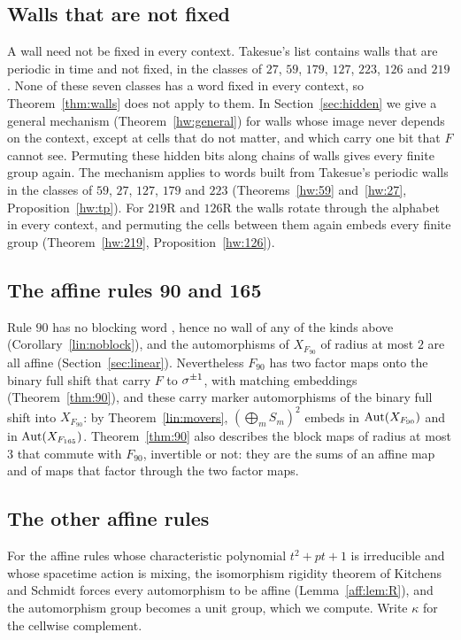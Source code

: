 \subsection*{Walls that are not fixed}
A wall need not be fixed in every context. Takesue's list contains walls that are periodic in time and not fixed, in the classes of $27$, $59$, $179$, $127$, $223$, $126$ and $219$ \cite[Section~4, (4.1)--(4.3), Fig.~2 and Table~III, walls (xii), (xiii), (xv), (xvi)]{Takesue1989}. None of these seven classes has a word fixed in every context, so Theorem~\ref{thm:walls} does not apply to them. In Section~\ref{sec:hidden} we give a general mechanism (Theorem~\ref{hw:general}) for walls whose image never depends on the context, except at cells that do not matter, and which carry one bit that $F$ cannot see. Permuting these hidden bits along chains of walls gives every finite group again. The mechanism applies to words built from Takesue's periodic walls in the classes of $59$, $27$, $127$, $179$ and $223$ (Theorems~\ref{hw:59} and~\ref{hw:27}, Proposition~\ref{hw:tp}). For $219$R and $126$R the walls rotate through the alphabet in every context, and permuting the cells between them again embeds every finite group (Theorem~\ref{hw:219}, Proposition~\ref{hw:126}).

\subsection*{The affine rules 90 and 165}
Rule $90$ has no blocking word \cite{Kurka1997,BT2000}, hence no wall of any of the kinds above (Corollary~\ref{lin:noblock}), and the automorphisms of $X_{F_{90}}$ of radius at most $2$ are all affine (Section~\ref{sec:linear}). Nevertheless $F_{90}$ has two factor maps onto the binary full shift that carry $F$ to $\sigma^{\pm1}$, with matching embeddings (Theorem~\ref{thm:90}), and these carry marker automorphisms of the binary full shift into $X_{F_{90}}$: by Theorem~\ref{lin:movers}, $(\bigoplus_mS_m)^2$ embeds in $\operatorname{Aut}(X_{F_{90}})$ and in $\operatorname{Aut}(X_{F_{165}})$. Theorem~\ref{thm:90} also describes the block maps of radius at most $3$ that commute with $F_{90}$, invertible or not: they are the sums of an affine map and of maps that factor through the two factor maps.

\subsection*{The other affine rules}
For the affine rules whose characteristic polynomial $t^2+pt+1$ is irreducible and whose spacetime action is mixing, the isomorphism rigidity theorem of Kitchens and Schmidt \cite{KS2000} forces every automorphism to be affine (Lemma~\ref{aff:lem:R}), and the automorphism group becomes a unit group, which we compute. Write $\kappa$ for the cellwise complement.


